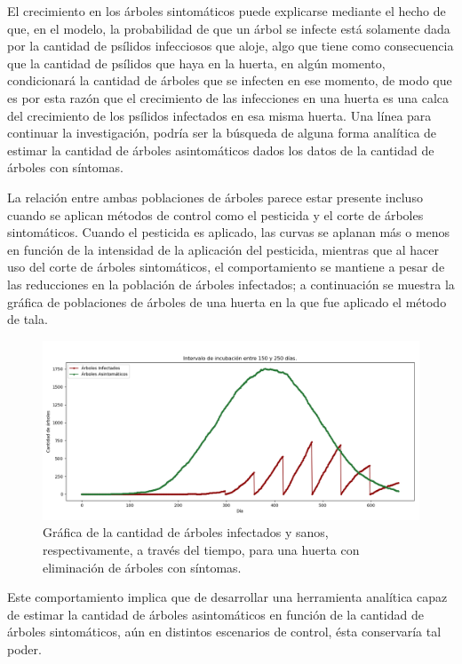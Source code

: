 El crecimiento en los árboles sintomáticos puede explicarse mediante el hecho de que, en el modelo, la probabilidad de que un árbol se infecte está solamente dada por la cantidad de psílidos infecciosos que aloje, algo que tiene como consecuencia que la cantidad de psílidos que haya en la huerta, en algún momento, condicionará la cantidad de árboles que se infecten en ese momento, de modo que es por esta razón que el crecimiento de las infecciones en una huerta es una calca del crecimiento de los psílidos infectados en esa misma huerta.
Una línea para continuar la investigación, podría ser la búsqueda de alguna forma analítica de estimar la cantidad de árboles asintomáticos dados los datos de la cantidad de árboles con síntomas.

La relación entre ambas poblaciones de árboles parece estar presente incluso cuando se aplican métodos de control como el pesticida y el corte de árboles sintomáticos. Cuando el pesticida es aplicado, las curvas se aplanan más o menos en función de la intensidad de la aplicación del pesticida, mientras que al hacer uso del corte de árboles sintomáticos, el comportamiento se mantiene a pesar de las reducciones en la población de árboles infectados; a continuación se muestra la gráfica de poblaciones de árboles de una huerta en la que fue aplicado el método de tala.
\begin{figure}[H]
\centering
\includegraphics[width=1\textwidth,keepaspectratio=true]{images/Imágenes C6/C6-9.png}
\caption{Gráfica de la cantidad de árboles infectados y sanos, respectivamente, a través del tiempo, para una huerta con eliminación de árboles con síntomas.}
\end{figure}
Este comportamiento implica que de desarrollar una herramienta analítica capaz de estimar la cantidad de árboles asintomáticos en función de la cantidad de árboles sintomáticos, aún en distintos escenarios de control, ésta conservaría tal poder.


